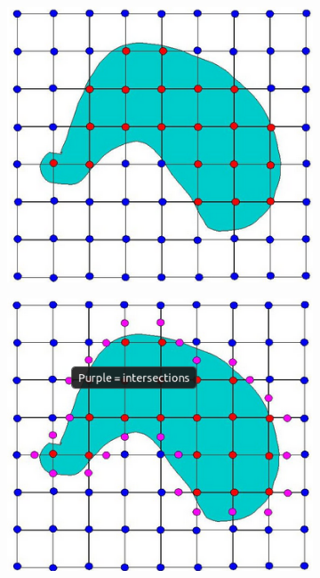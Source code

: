 \begin{figure}[!h]
\begin{minipage}{.25\textwidth}
\begin{subfigure}{\textwidth}
		\end{subfigure}
	\end{minipage}
	\hfill
	\begin{minipage}{.25\textwidth}
		\begin{subfigure}{\textwidth}
			\includegraphics[width=\textwidth]{figures/MC_grid_pts.png}
		\end{subfigure}
		\begin{subfigure}{\textwidth}
			\includegraphics[width=\textwidth]{figures/MC_pts_interpolated.png}

\end{subfigure}
\end{minipage}
\end{figure}
